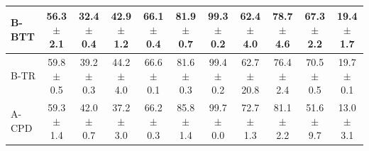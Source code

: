 \begin{table}[t]
\begin{tabular}{lcccccccccc}
\midrule
\shortstack[l]{B-BTT \\ {}} & \shortstack{56.3 \\ $\pm$ 2.1} & \shortstack{32.4 \\ $\pm$ 0.4} & \shortstack{42.9 \\ $\pm$ 1.2} & \shortstack{66.1 \\ $\pm$ 0.4} & \shortstack{81.9 \\ $\pm$ 0.7} & \shortstack{99.3 \\ $\pm$ 0.2} & \shortstack{62.4 \\ $\pm$ 4.0} & \shortstack{78.7 \\ $\pm$ 4.6} & \shortstack{67.3 \\ $\pm$ 2.2} & \shortstack{19.4 \\ $\pm$ 1.7} \\
\midrule
\shortstack[l]{B-TR \\ {}} & \shortstack{59.8 \\ $\pm$ 0.5} & \shortstack{39.2 \\ $\pm$ 0.3} & \shortstack{44.2 \\ $\pm$ 4.0} & \shortstack{66.6 \\ $\pm$ 0.1} & \shortstack{81.6 \\ $\pm$ 0.3} & \shortstack{99.4 \\ $\pm$ 0.2} & \shortstack{62.7 \\ $\pm$ 20.8} & \shortstack{76.4 \\ $\pm$ 2.4} & \shortstack{70.5 \\ $\pm$ 0.5} & \shortstack{19.7 \\ $\pm$ 0.1} \\
\midrule\midrule
\shortstack[l]{A-CPD \\ {}} & \shortstack{59.3 \\ $\pm$ 1.4} & \shortstack{42.0 \\ $\pm$ 0.7} & \shortstack{37.2 \\ $\pm$ 3.0} & \shortstack{66.2 \\ $\pm$ 0.3} & \shortstack{85.8 \\ $\pm$ 1.4} & \shortstack{99.7 \\ $\pm$ 0.0} & \shortstack{72.7 \\ $\pm$ 1.3} & \shortstack{81.1 \\ $\pm$ 2.2} & \shortstack{51.6 \\ $\pm$ 9.7} & \shortstack{13.0 \\ $\pm$ 3.1} \\
\midrule

\end{tabular}
\end{table}
